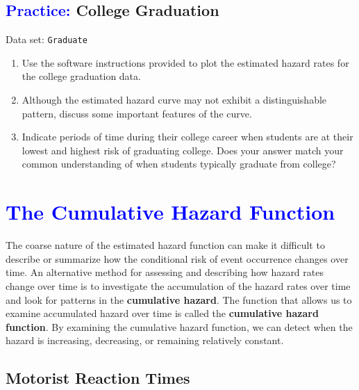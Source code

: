 \documentclass[
]{report}
\begin{document}
\hypertarget{college-graduation-1}{%
\subsection*{\texorpdfstring{\textcolor{blue}{Practice:} College Graduation}{ College Graduation}}\label{college-graduation-1}}

Data set: \texttt{Graduate}

\begin{enumerate}
\def\labelenumi{\arabic{enumi}.}
\setcounter{enumi}{44}
\item
  Use the software instructions provided to plot the estimated hazard rates for the college graduation data.
\item
  Although the estimated hazard curve may not exhibit a distinguishable pattern, discuss some important features of the curve.
\item
  Indicate periods of time during their college career when students are at their lowest and highest risk of graduating college. Does your answer match your common understanding of when students typically graduate from college?
\end{enumerate}

\hypertarget{section-85}{%
\section{\texorpdfstring{\textcolor{blue}{The Cumulative Hazard Function}}{}}\label{section-85}}

The coarse nature of the estimated hazard function can make it difficult to describe or summarize how the conditional risk of event occurrence changes over time. An alternative method for assessing and describing how hazard rates change over time is to investigate the accumulation of the hazard rates over time and look for patterns in the \textbf{cumulative hazard}. The function that allows us to examine accumulated hazard over time is called the \textbf{cumulative hazard function}. By examining the cumulative hazard function, we can detect when the hazard is increasing, decreasing, or remaining relatively constant.

\hypertarget{motorist-reaction-times}{%
\subsection*{Motorist Reaction Times}\label{motorist-reaction-times}}
\end{document}
